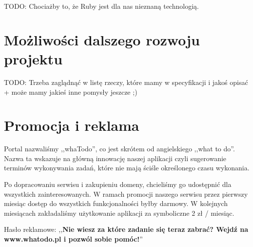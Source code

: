 \documentclass[pdflatex,11pt]{aghdpl}
\begin{document}
TODO: Chociażby to, że Ruby jest dla nas nieznaną technologią.

\section{Możliwości dalszego rozwoju projektu}

TODO: Trzeba zaglądnąć w listę rzeczy, które mamy w specyfikacji i jakoś opisać + może mamy jakieś inne pomysły jeszcze ;)

\section{Promocja i reklama}

Portal nazwaliśmy ,,whaTodo'', co jest skrótem od angielskiego ,,what to do''. Nazwa ta wskazuje na główną innowację naszej aplikacji czyli sugerowanie terminów wykonywania zadań, które nie mają ściśle określonego czasu wykonania.

Po dopracowaniu serwisu i zakupieniu domeny, chcieliśmy go udostępnić dla wszystkich zainteresowanych. W ramach promocji naszego serwisu przez pierwszy miesiąc dostęp do wszystkich funkcjonalności byłby darmowy. W kolejnych miesiącach zakładaliśmy użytkowanie aplikacji za symboliczne 2 zł / miesiąc.

Hasło reklamowe: ,,\textbf{Nie wiesz za które zadanie się teraz zabrać? Wejdź na www.whatodo.pl i pozwól sobie
pomóc!}''
\end{document}
